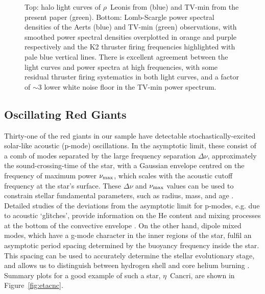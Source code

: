 \documentclass[modern]{aastex62}
\newcommand{\numax}{\mbox{$\nu_{\rm max}$}\xspace}
\newcommand{\Dnu}{\mbox{$\Delta \nu$}\xspace}
\begin{document}
\begin{figure}
\caption{Top: halo light curves of $\rho$~Leonis from \citet{Aerts2018} (blue) and TV-min from the present paper (green). Bottom: Lomb-Scargle power spectral densities of the Aerts (blue) and TV-min (green) observations, with smoothed power spectral densities overplotted in orange and purple respectively and the K2 thruster firing frequencies highlighted with pale blue vertical lines. There is excellent agreement between the light curves and power spectra at high frequencies, with some residual thruster firing systematics in both light curves, and a factor of $\sim 3$ lower white noise floor in the TV-min power spectrum.}
\label{rholeo_comparison}
\end{figure}

\subsection{Oscillating Red Giants}
\label{sec:rgs}
Thirty-one of the red giants in our sample have detectable stochastically-excited solar-like acoustic (p-mode) oscillations. In the asymptotic limit, these consist of a comb of modes separated by the large frequency separation \Dnu, approximately the sound-crossing-time of the star, with a Gaussian envelope centred on the frequency of maximum power \numax, which scales with the acoustic cutoff frequency at the star's surface. 
These \Dnu and \numax values can be used to constrain stellar fundamental parameters, such as radius, mass, and age \citep[e.g.][for a recent review]{2017A&ARv..25....1H}. Detailed studies of the deviations from the asymptotic limit for p-modes, e.g. due to acoustic `glitches', provide information on the He content and mixing processes at the bottom of the convective envelope \citep[e.g. ][]{Verma2019}. On the other hand, dipole mixed modes, which have a g-mode character in the inner regions of the star, fulfil an asymptotic period spacing determined by the buoyancy frequency inside the star. This spacing can be used to accurately determine the stellar evolutionary stage, and allows us to distinguish between hydrogen shell and core helium burning \citep{bedding2011}. 
Summary plots for a good example of such a star, $\eta$~Cancri, are shown in Figure~\ref{fig:etacnc}.
\end{document}
